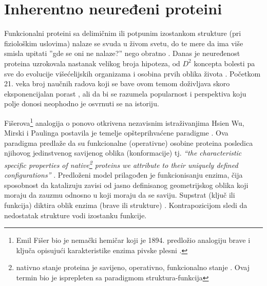 
\chapter{Inherentno neuređeni proteini} %

\label{IDP} %


Funkcionalni proteini sa delimičnim ili potpunim izostankom strukture (pri
fiziološkim uslovima) nalaze se svuda u živom svetu, do te mere da ima više
smisla upitati ''gde se oni ne nalaze?'' nego obratno \parencite{uversky2016}.
Danas je neuređenost proteina uzrokovala nastanak velikog broja hipoteza, od
$D^2$ koncepta bolesti \parencite{Uversky2008} pa sve do evolucije
višećelijskih organizama \parencite{Romero2006} i osobina prvih oblika života
\parencite{uversky2016, Trifonov2000}. Početkom 21. veka broj
naučnih radova koji se bave ovom temom doživljava skoro eksponencijalan
porast \parencite{oldfield2014}, ali  da bi se razumela popularnost i 
perspektiva koju polje donosi neophodno je osvrnuti se na istoriju.

Fišerova\footnote{ Emil Fišer bio je nemački hemičar koji je 1894. predložio
analogiju brave i ključa opisujući karakteristike enzima pivske
plesni \parencite{dunker2001}.  } analogija o  ponovo
otkrivena nezavisnim istraživanjima Hsien Wu,  Mirski i Paulinga 
postavila je temelje opšteprihvaćene
 paradigme \parencite{dunker2001}.
Ova paradigma predlaže da su funkcionalne (operativne) osobine proteina
posledica njihovog jedinstvenog savijenog oblika (konformacije) tj.
\textit{“the characteristic specific properties of native\footnote{ nativno stanje
  proteina je savijeno, operativno, funkcionalno stanje \parencite{dunker2001}.
Ovaj termin bio je isprepleten sa paradigmom struktura-funkcija} proteins we
attribute to their uniquely defined configurations”} \parencite{MirskyPauling1936}. Predloženi model prilagođen je
funkcionisanju enzima, čija sposobnost da katalizuju zavisi od jasno
definisanog geometrijskog oblika koji moraju da zauzmu odnosno u koji moraju da
se saviju.  Supstrat (ključ ili funkcija) diktira oblik enzima (brave ili
strukture) \parencite{biology}.  Kontrapozicijom sledi da nedostatak strukture
vodi izostanku funkcije.

